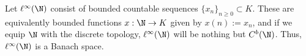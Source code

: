         \begin{example} \label{example: finite_dimensional_normed_spaces_are_banach}
            
        \end{example}
        \begin{example} \label{example: bounded_functions}
            
        \end{example}
        \begin{example} \label{example: bounded_countable_sequences}
            Let $\ell^{\infty}(\N)$ consist of bounded countable sequences $\{x_n\}_{n \geq 0} \subset K$. These are equivalently bounded functions $x: \N \to K$ given by $x(n) := x_n$, and if we equip $\N$ with the discrete topology, $\ell^{\infty}(\N)$ will be nothing but $C^b(\N)$. Thus, $\ell^{\infty}(\N)$ is a Banach space.
        \end{example}

